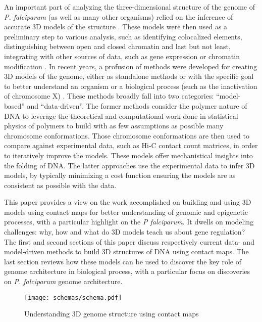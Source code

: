 \documentclass[2columns]{article}
\begin{document}
An important part of analyzing the three-dimensional structure of the genome
of {\em P. falciparum} (as well as many other organisms) relied on the
inference of accurate 3D models of the structure
\citep{duan:three-dimensional, ay:three-dimensional, bau:three-dimensional}. These models were then used as
a preliminary step to various analysis, such as identifying colocalized
elements, distinguishing between open and closed chromatin and last but not
least, integrating with other sources of data, such as gene expression or
chromatin modification \citep{duan:three-dimensional, bau:three-dimensional,
ay:three-dimensional}. In recent years, a profusion of methods were developed
for creating 3D models of the genome, either as standalone methods or with the
specific goal to better understand an organism
\citep{umbarger:three-dimensional, ay:multiple, duan:three-dimensional} or
a biological process (such as
the inactivation of chromosome X) \citep{bau:three-dimensional, deng:bipartite}. These
methods broadly fall into two categories: ``model-based'' and ``data-driven''.
The former methods consider the polymer nature of DNA to leverage the
theoretical and computational work done in statistical physics of polymers to
build with as few assumptions as possible many chromosome conformations. Those
chromosome conformations are then used to compare against experimental data,
such as Hi-C contact count matrices, in order to iteratively improve the
models. These models offer mechanistical insights into the folding of DNA. The
latter approaches use the experimental data to infer 3D models, by typically
minimizing a cost function ensuring the models are as consistent as possible
with the data.

This paper provides a view on the work accomplished on building and using 3D
models using contact maps for better understanding of genomic and epigenetic
processes, with a particular highlight on the {\em P falciparum}. It dwells on
modeling challenges: why, how and what do 3D models teach us about gene
regulation? The first and second sections of this paper discuss respectively
current data- and model-driven methods to build 3D structures of DNA
using contact maps.  The last section reviews how these models can be used to
discover the key role of genome architecture in biological process, with a
particular focus on discoveries on {\em P. falciparum} genome architecture.


\begin{figure}
\centering
\texttt{[image: schemas/schema.pdf]}
\caption{Understanding 3D genome structure using contact maps}
\label{Fig1}
\end{figure}
\end{document}
